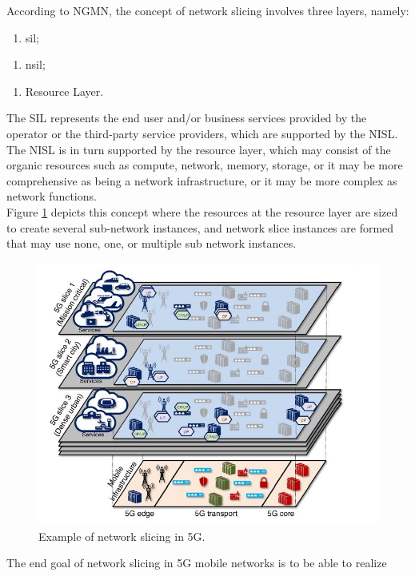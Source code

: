 \documentclass{report}
\begin{document}
According to NGMN, the concept of network slicing involves three layers,
namely:
\begin{enumerate}[1]
\item \gls{sil};
\end{enumerate}
\begin{enumerate}[2]
\item \gls{nsil};
\end{enumerate}
\begin{enumerate}[3]
\item Resource Layer.
\end{enumerate}
The SIL represents the end user and/or
business services provided by the operator or the third-party service providers,
which are supported by the NISL. The NISL
is in turn supported by the resource layer, which may consist of the organic
resources such as compute, network, memory, storage, or it may be more
comprehensive as being a network infrastructure, or it may be more complex
as network functions.\\
Figure \ref{layers} depicts this concept where the resources at
the resource layer are sized to create several sub-network instances,
and network slice instances are formed that may use none, one, or multiple sub
network instances.\\
\begin{figure}
\centering
\includegraphics[scale=0.65]{pics/1.JPG}
\caption{Example of network slicing in 5G. \cite{al20185g}}
\label{layers}
\end{figure}The end goal of network slicing in 5G mobile networks is to be able to realize
\end{document}
